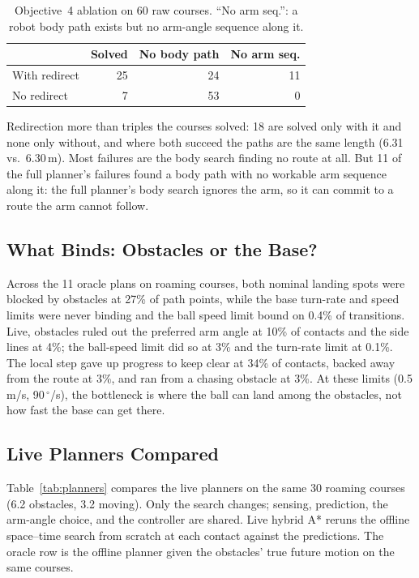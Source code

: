 \documentclass[10pt,twocolumn]{article}
\begin{document}
\begin{table}[h]
\centering
\small
\setlength{\tabcolsep}{4pt}
\begin{tabular}{@{}lrrr@{}}
\toprule
& \textbf{Solved} & \textbf{No body path} & \textbf{No arm seq.} \\
\midrule
With redirect    & 25 & 24 & 11 \\
No redirect      & 7  & 53 & 0 \\
\bottomrule
\end{tabular}
\caption{Objective~4 ablation on 60 raw courses. ``No arm seq.'': a robot
body path exists but no arm-angle sequence along it.}
\label{tab:redirect}
\end{table}

Redirection more than triples the courses solved: 18 are solved only with
it and none only without, and where both succeed the paths are the same
length (6.31 vs.\ 6.30\,m). Most failures are the body search finding no
route at all. But 11 of the full planner's failures found a body path with
no workable arm sequence along it: the full planner's body search ignores
the arm, so it can commit to a route the arm cannot follow.

\subsection{What Binds: Obstacles or the Base?}
\label{sec:binding}
Across the 11 oracle plans on roaming courses, both nominal landing spots
were blocked by obstacles at 27\% of path points, while the base turn-rate
and speed limits were never binding and the ball speed limit bound on
0.4\% of transitions. Live, obstacles ruled out the preferred arm angle at
10\% of contacts and the side lines at 4\%; the ball-speed limit did so at
3\% and the turn-rate limit at 0.1\%. The local step gave up progress to
keep clear at 34\% of contacts, backed away from the route at 3\%, and ran
from a chasing obstacle at 3\%. At these limits (0.5\,m/s, 90\,$^\circ$/s),
the bottleneck is where the ball can land among the obstacles, not how fast
the base can get there.

\subsection{Live Planners Compared}
Table~\ref{tab:planners} compares the live planners on the same 30 roaming
courses (6.2 obstacles, 3.2 moving). Only the search changes; sensing,
prediction, the arm-angle choice, and the controller are shared. Live
hybrid A* reruns the offline space--time search from scratch at each
contact against the predictions. The oracle row is the offline planner
given the obstacles' true future motion on the same courses.
\end{document}

